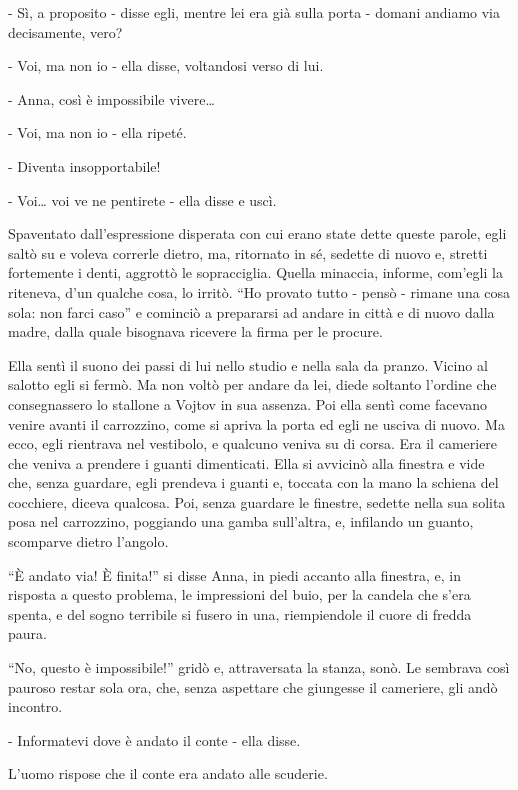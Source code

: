- Sì, a proposito - disse egli, mentre lei era già sulla porta - domani andiamo via decisamente, vero? 

- Voi, ma non io - ella disse, voltandosi verso di lui. 

- Anna, così è impossibile vivere\ldots{} 

- Voi, ma non io - ella ripeté. 

- Diventa insopportabile! 

- Voi\ldots{} voi ve ne pentirete - ella disse e uscì. 

Spaventato dall'espressione disperata con cui erano state dette queste parole, egli saltò su e voleva correrle dietro, ma, ritornato in sé, sedette di nuovo e, stretti fortemente i denti, aggrottò le sopracciglia. Quella minaccia, informe, com'egli la riteneva, d'un qualche cosa, lo irritò. ``Ho provato tutto - pensò - rimane una cosa sola: non farci caso'' e cominciò a prepararsi ad andare in città e di nuovo dalla madre, dalla quale bisognava ricevere la firma per le procure. 

Ella sentì il suono dei passi di lui nello studio e nella sala da pranzo. Vicino al salotto egli si fermò. Ma non voltò per andare da lei, diede soltanto l'ordine che consegnassero lo stallone a Vojtov in sua assenza. Poi ella sentì come facevano venire avanti il carrozzino, come si apriva la porta ed egli ne usciva di nuovo. Ma ecco, egli rientrava nel vestibolo, e qualcuno veniva su di corsa. Era il cameriere che veniva a prendere i guanti dimenticati. Ella si avvicinò alla finestra e vide che, senza guardare, egli prendeva i guanti e, toccata con la mano la schiena del cocchiere, diceva qualcosa. Poi, senza guardare le finestre, sedette nella sua solita posa nel carrozzino, poggiando una gamba sull'altra, e, infilando un guanto, scomparve dietro l'angolo. 

\label{xxvii-5} 

``È andato via! È finita!'' si disse Anna, in piedi accanto alla finestra, e, in risposta a questo problema, le impressioni del buio, per la candela che s'era spenta, e del sogno terribile si fusero in una, riempiendole il cuore di fredda paura. 

``No, questo è impossibile!'' gridò e, attraversata la stanza, sonò. Le sembrava così pauroso restar sola ora, che, senza aspettare che giungesse il cameriere, gli andò incontro. 

- Informatevi dove è andato il conte - ella disse. 

L'uomo rispose che il conte era andato alle scuderie. 

